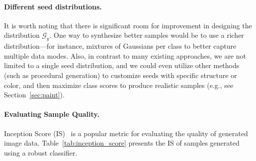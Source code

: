 \documentclass{article}
\newcommand{\Gy}{\mathcal{G}_y}
\begin{document}
\paragraph{Different seed distributions.} It is worth noting that there is significant 
room for improvement in designing the distribution $\Gy$. One way 
to synthesize better samples would be to use a richer distribution---for 
instance, mixtures of Gaussians per class to better capture multiple data modes. 
Also, in contrast to many existing approaches, we are not limited to a single seed distribution,
and we could even utilize other methods (such as procedural generation) 
to customize seeds with specific structure or color, and then maximize 
class scores to produce realistic samples (e.g., see Section~\ref{sec:paint}).

\paragraph{Evaluating Sample Quality.}
Inception Score (IS)~\cite{salimans2016improved} is a popular metric for
evaluating the quality of generated image data. 
Table~\ref{tab:inception_score} presents the IS of samples
generated using a robust classifier.
\end{document}
